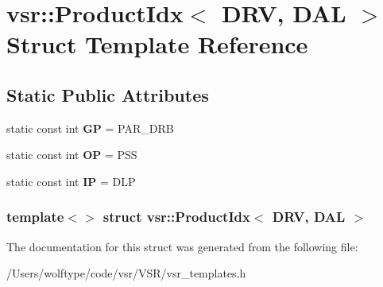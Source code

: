 \hypertarget{structvsr_1_1_product_idx_3_01_d_r_v_00_01_d_a_l_01_4}{\section{vsr\-:\-:Product\-Idx$<$ D\-R\-V, D\-A\-L $>$ Struct Template Reference}
\label{structvsr_1_1_product_idx_3_01_d_r_v_00_01_d_a_l_01_4}
}
\subsection*{Static Public Attributes}
\begin{DoxyCompactItemize}
\item 
\hypertarget{structvsr_1_1_product_idx_3_01_d_r_v_00_01_d_a_l_01_4_abb2980a749f6f477eb6dec622e11198d}{static const int {\bfseries G\-P} = P\-A\-R\-\_\-\-D\-R\-B}\label{structvsr_1_1_product_idx_3_01_d_r_v_00_01_d_a_l_01_4_abb2980a749f6f477eb6dec622e11198d}

\item 
\hypertarget{structvsr_1_1_product_idx_3_01_d_r_v_00_01_d_a_l_01_4_ab86830d29ba157c19b3f0f94fa0eed24}{static const int {\bfseries O\-P} = P\-S\-S}\label{structvsr_1_1_product_idx_3_01_d_r_v_00_01_d_a_l_01_4_ab86830d29ba157c19b3f0f94fa0eed24}

\item 
\hypertarget{structvsr_1_1_product_idx_3_01_d_r_v_00_01_d_a_l_01_4_a9f547643410ae07292b25abc4063fb35}{static const int {\bfseries I\-P} = D\-L\-P}\label{structvsr_1_1_product_idx_3_01_d_r_v_00_01_d_a_l_01_4_a9f547643410ae07292b25abc4063fb35}

\end{DoxyCompactItemize}
\subsubsection*{template$<$$>$ struct vsr\-::\-Product\-Idx$<$ D\-R\-V, D\-A\-L $>$}



The documentation for this struct was generated from the following file\-:\begin{DoxyCompactItemize}
\item 
/\-Users/wolftype/code/vsr/\-V\-S\-R/vsr\-\_\-templates.\-h\end{DoxyCompactItemize}
